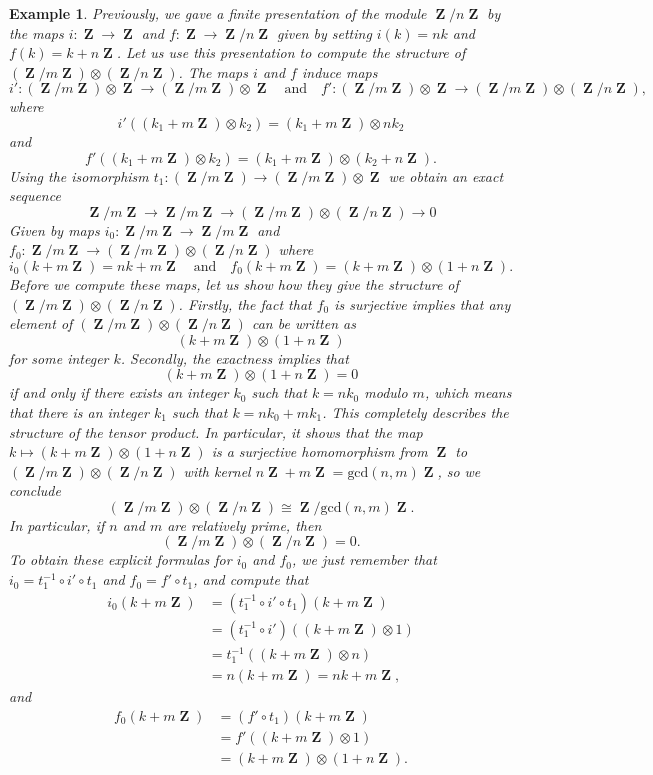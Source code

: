 \documentclass{article}
\theoremstyle{plain}
\newtheorem*{example}{Example}
\theoremstyle{remark}
\theoremstyle{definition}
\DeclareMathOperator{\ZZ}{\mathbf{Z}}
\begin{document}
\begin{example}
	Previously, we gave a finite presentation of the module $\ZZ / n \ZZ$ by the maps $i: \ZZ \to \ZZ$ and $f: \ZZ \to \ZZ / n \ZZ$ given by setting $i(k) = nk$ and $f(k) = k + n\ZZ$. Let us use this presentation to compute the structure of $(\ZZ / m \ZZ) \otimes (\ZZ / n \ZZ)$. The maps $i$ and $f$ induce maps
	\[ i': (\ZZ / m \ZZ) \otimes \ZZ \to (\ZZ / m \ZZ) \otimes \ZZ \quad\text{and}\quad f': (\ZZ / m \ZZ) \otimes \ZZ \to (\ZZ / m \ZZ) \otimes (\ZZ / n \ZZ), \]
	where
	\[ i'((k_1 + m \ZZ) \otimes k_2) = (k_1 + m \ZZ) \otimes nk_2 \]
	and
	\[ f'((k_1 + m \ZZ) \otimes k_2) = (k_1 + m \ZZ) \otimes (k_2 + n \ZZ). \]
	Using the isomorphism $t_1: (\ZZ / m \ZZ) \to (\ZZ / m \ZZ) \otimes \ZZ$ we obtain an exact sequence
	\[ \ZZ / m \ZZ \to \ZZ / m \ZZ \to (\ZZ / m \ZZ) \otimes (\ZZ / n \ZZ) \to 0 \]
	Given by maps $i_0: \ZZ / m \ZZ \to \ZZ / m \ZZ$ and $f_0: \ZZ / m \ZZ \to (\ZZ / m \ZZ) \otimes (\ZZ / n \ZZ)$ where
	\[ i_0(k + m \ZZ) = nk + m \ZZ \quad\text{and}\quad f_0(k + m \ZZ) = (k + m \ZZ) \otimes (1 + n \ZZ). \]
	Before we compute these maps, let us show how they give the structure of $(\ZZ / m \ZZ) \otimes (\ZZ / n \ZZ)$. Firstly, the fact that $f_0$ is surjective implies that any element of $(\ZZ / m \ZZ) \otimes (\ZZ / n \ZZ)$ can be written as
	\[ (k + m \ZZ) \otimes (1 + n \ZZ) \]
	for some integer $k$. Secondly, the exactness implies that
	\[ (k + m \ZZ) \otimes (1 + n \ZZ) = 0 \]
	if and only if there exists an integer $k_0$ such that $k = n k_0$ modulo $m$, which means that there is an integer $k_1$ such that $k = nk_0 + mk_1$. This completely describes the structure of the tensor product. In particular, it shows that the map $k \mapsto (k + m \ZZ) \otimes (1 + n \ZZ)$ is a surjective homomorphism from $\ZZ$ to $(\ZZ / m \ZZ) \otimes (\ZZ / n \ZZ)$ with kernel $n \ZZ + m \ZZ = \text{gcd}(n,m) \ZZ$, so we conclude
	\[ (\ZZ / m \ZZ) \otimes (\ZZ / n \ZZ) \cong \ZZ / \text{gcd}(n,m) \ZZ. \]
	In particular, if $n$ and $m$ are relatively prime, then
	\[ (\ZZ / m \ZZ) \otimes (\ZZ / n \ZZ) = 0. \]
	To obtain these explicit formulas for $i_0$ and $f_0$, we just remember that $i_0 = t_1^{-1} \circ i' \circ t_1$ and $f_0 = f' \circ t_1$, and compute that
	\begin{align*}
		i_0(k + m \ZZ) &= (t_1^{-1} \circ i' \circ t_1)(k + m \ZZ)\\
		&= (t_1^{-1} \circ i')((k + m \ZZ) \otimes 1)\\
		&= t_1^{-1}((k + m \ZZ) \otimes n)\\
		&= n(k + m \ZZ) = nk + m \ZZ,
	\end{align*}
	and
	\begin{align*}
		f_0(k + m \ZZ) &= (f' \circ t_1)(k + m \ZZ)\\
		&= f'((k + m \ZZ) \otimes 1)\\
		&= (k + m \ZZ) \otimes (1 + n \ZZ).
	\end{align*}
\end{example}
\end{document}
